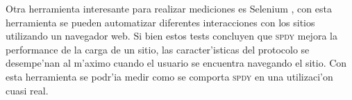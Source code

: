 \documentclass[a4paper,11pt,twocolumn]{article}
\begin{document}
Otra herramienta interesante para realizar mediciones es Selenium \cite{selenium}, con esta herramienta se pueden automatizar diferentes interacciones con los sitios utilizando un navegador web. Si bien estos tests concluyen que \textsc{spdy} mejora la performance de la carga de un sitio, las caracter'isticas del protocolo se desempe'nan al m'aximo cuando el usuario se encuentra navegando el sitio. Con esta herramienta se podr'ia medir como se comporta \textsc{spdy} en una utilizaci'on cuasi real.

\nocite{*}

\end{document}
